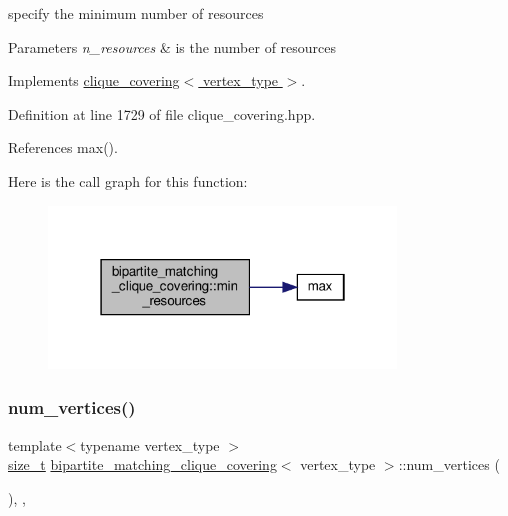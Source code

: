 specify the minimum number of resources 


\begin{DoxyParams}{Parameters}
{\em n\+\_\+resources} & is the number of resources \\
\hline
\end{DoxyParams}


Implements \hyperlink{classclique__covering_a031948f90f5b05911a91b85c578fc9ca}{clique\+\_\+covering$<$ vertex\+\_\+type $>$}.



Definition at line 1729 of file clique\+\_\+covering.\+hpp.



References max().

Here is the call graph for this function\+:
\nopagebreak
\begin{figure}[H]
\begin{center}
\leavevmode
\includegraphics[width=262pt]{d1/df2/classbipartite__matching__clique__covering_a6a23bb597b452b2a5ba8f7ca07673204_cgraph}
\end{center}
\end{figure}
\mbox{\label{classbipartite__matching__clique__covering_a023f2eea658d97a22e5dbddc89fb1da5}} 
\subsubsection{\texorpdfstring{num\+\_\+vertices()}{num\_vertices()}}
{\footnotesize\ttfamily template$<$typename vertex\+\_\+type $>$ \\
\hyperlink{tutorial__fpt__2017_2intro_2sixth_2test_8c_a7c94ea6f8948649f8d181ae55911eeaf}{size\+\_\+t} \hyperlink{classbipartite__matching__clique__covering}{bipartite\+\_\+matching\+\_\+clique\+\_\+covering}$<$ vertex\+\_\+type $>$\+::num\+\_\+vertices (\begin{DoxyParamCaption}{ }\end{DoxyParamCaption})\hspace{0.3cm}{\ttfamily [inline]}, {\ttfamily [override]}, {\ttfamily [virtual]}}



